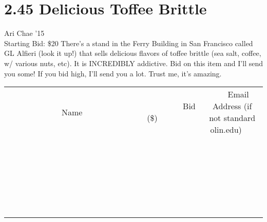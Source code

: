 \documentclass[11pt]{article}
\begin{document}
\section*{2.45 Delicious Toffee Brittle}
Ari Chae '15
\\
Starting Bid: \$20
\newline
There's a stand in the Ferry Building in San Francisco called GL Alfieri (look it up!) that sells delicious flavors of toffee brittle (sea salt, coffee, w/ various nuts, etc). It is INCREDIBLY addictive. Bid on this item and I'll send you some! If you bid high, I'll send you a lot. Trust me, it's amazing.
\\[6ex]
\begin{tabular}{c c c}
~~~~~~~~~~~~~Name~~~~~~~~~~~~~ & ~~~~~~~~~Bid (\$)~~~~~~~~~  & ~~~Email Address (if not standard olin.edu)~~~\\
 & & \\
\hline
 & & \\
\hline
 & & \\
\hline
 & & \\
\hline
 & & \\
\hline
 & & \\
\hline
 & & \\
\hline
 & & \\
\hline
 & & \\
\hline
 & & \\
\hline
 & & \\
\hline
 & & \\
\hline
 & & \\
\hline
 & & \\
\hline
 & & \\
\hline
 & & \\
\hline
 & & \\
\hline
 & & \\
\hline
 & & \\
\hline
 & & \\
\hline
 & & \\
\hline
 & & \\
\hline
 & & \\
\hline
 & & \\
\hline
 & & \\
\hline
 & & \\
\hline
\end{tabular}
\newpage
\end{document}
